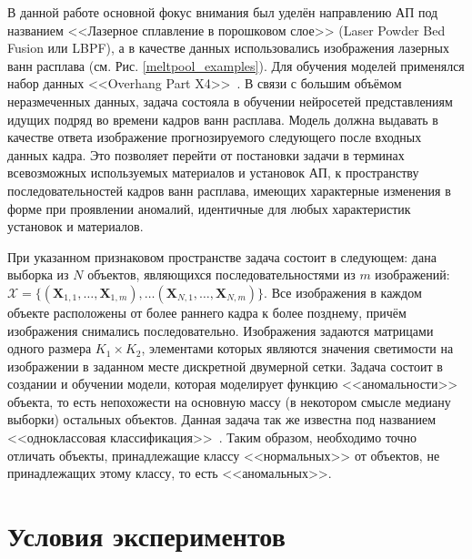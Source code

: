 \documentclass{article}
\begin{document}
    В данной работе основной фокус внимания был уделён направлению АП под названием <<Лазерное сплавление в порошковом слое>> (Laser Powder Bed Fusion или LBPF), а в качестве данных использовались изображения лазерных ванн расплава (см. Рис. \ref{meltpool_examples}). Для обучения моделей применялся набор данных <<Overhang Part X4>>~\cite{nist_dataset}. В связи с большим объёмом неразмеченных данных, задача состояла в обучении нейросетей представлениям идущих подряд во времени кадров ванн расплава. Модель должна выдавать в качестве ответа изображение прогнозируемого следующего после входных данных кадра. Это позволяет перейти от постановки задачи в терминах всевозможных используемых материалов и установок АП, к пространству последовательностей кадров ванн расплава, имеющих характерные изменения в форме при проявлении аномалий, идентичные для любых характеристик установок и материалов.

    При указанном признаковом пространстве задача состоит в следующем: дана выборка из $N$ объектов, являющихся последовательностями из $m$ изображений: $\mathbf{\mathcal{X}} = \{(\mathbf{X}_{1, 1}, \dots, \mathbf{X}_{1, m}), \dots (\mathbf{X}_{N, 1}, \dots, \mathbf{X}_{N, m})\}$. Все изображения в каждом объекте расположены от более раннего кадра к более позднему, причём изображения снимались последовательно. Изображения задаются матрицами одного размера $K_1 \times K_2$, элементами которых являются значения светимости на изображении в заданном месте дискретной двумерной сетки. Задача состоит в создании и обучении модели, которая моделирует функцию <<аномальности>> объекта, то есть непохожести на основную массу (в некотором смысле медиану выборки) остальных объектов. Данная задача так же известна под названием <<одноклассовая классификация>>~\cite{MOYA1996463}. Таким образом, необходимо точно отличать объекты, принадлежащие классу <<нормальных>> от объектов, не принадлежащих этому классу, то есть <<аномальных>>.

\section{Условия экспериментов}
\end{document}
